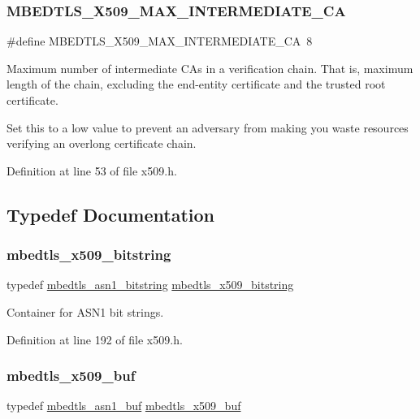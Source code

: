 \subsubsection{\texorpdfstring{M\+B\+E\+D\+T\+L\+S\+\_\+\+X509\+\_\+\+M\+A\+X\+\_\+\+I\+N\+T\+E\+R\+M\+E\+D\+I\+A\+T\+E\+\_\+\+CA}{MBEDTLS\_X509\_MAX\_INTERMEDIATE\_CA}}
{\footnotesize\ttfamily \#define M\+B\+E\+D\+T\+L\+S\+\_\+\+X509\+\_\+\+M\+A\+X\+\_\+\+I\+N\+T\+E\+R\+M\+E\+D\+I\+A\+T\+E\+\_\+\+CA~8}

Maximum number of intermediate C\+As in a verification chain. That is, maximum length of the chain, excluding the end-\/entity certificate and the trusted root certificate.

Set this to a low value to prevent an adversary from making you waste resources verifying an overlong certificate chain. 

Definition at line 53 of file x509.\+h.



\subsection{Typedef Documentation}
\mbox{\label{group__x509__module_gaf25a97602f25027e160f22f6d5590636}} 
\subsubsection{\texorpdfstring{mbedtls\+\_\+x509\+\_\+bitstring}{mbedtls\_x509\_bitstring}}
{\footnotesize\ttfamily typedef \mbox{\hyperlink{structmbedtls__asn1__bitstring}{mbedtls\+\_\+asn1\+\_\+bitstring}} \mbox{\hyperlink{group__x509__module_gaf25a97602f25027e160f22f6d5590636}{mbedtls\+\_\+x509\+\_\+bitstring}}}

Container for A\+S\+N1 bit strings. 

Definition at line 192 of file x509.\+h.

\mbox{\label{group__x509__module_ga4d02c9e8e4e2934555e0d132cd2976dc}} 
\subsubsection{\texorpdfstring{mbedtls\+\_\+x509\+\_\+buf}{mbedtls\_x509\_buf}}
{\footnotesize\ttfamily typedef \mbox{\hyperlink{structmbedtls__asn1__buf}{mbedtls\+\_\+asn1\+\_\+buf}} \mbox{\hyperlink{group__x509__module_ga4d02c9e8e4e2934555e0d132cd2976dc}{mbedtls\+\_\+x509\+\_\+buf}}}


